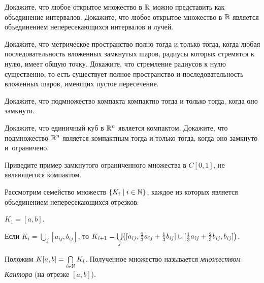 \documentclass[a4paper,12pt]{article}
\begin{document}

Докажите, что любое открытое множество в $\mathbb{R}$ можно представить как объединение интервалов.
Докажите, что любое открытое множество в $\mathbb{R}$ является объединением непересекающихся интервалов и лучей.


Докажите, что метрическое пространство полно тогда и только тогда, когда любая последовательность вложенных замкнутых шаров, радиусы которых стремятся к нулю, имеет общую точку.
Докажите, что стремление радиусов к нулю существенно, то есть существует полное пространство и последовательность вложенных шаров, имеющих пустое пересечение.\\

Докажите, что подмножество компакта компактно тогда и только тогда, когда оно замкнуто.

Докажите, что единичный куб в $\mathbb{R}^n$ является компактом.
Докажите, что подмножество $\mathbb{R}^n$ является компактным тогда и только тогда, когда оно замкнуто и~ограничено.

Приведите пример замкнутого ограниченного множества в $C[0,1]$, не являющегося компактом.



Рассмотрим семейство множеств $\{K_i \mid i \in \mathbb{N}\}$, каждое из которых является объединением непересекающихся отрезков:
\begin{items}{-3}
\item
$K_{1} = [a,b]$.
\item
Если $K_{i} = \bigcup\limits_{j}[a_{ij}, b_{ij}]$, то $K_{i+1} = \bigcup\limits_{j}\bigl([a_{ij}, \frac23 a_{ij} + \frac13 b_{ij}] \cup [\frac13 a_{ij} + \frac23 b_{ij}, b_{ij}]\bigr)$.
\end{items}
\vskip -2mm
Положим $K[a,b] = \bigcap\limits_{i\in\mathbb{N}}K_i$. Полученное множество называется \emph{множеством Кантора} (на отрезке $[a,b]$).
\end{document}
